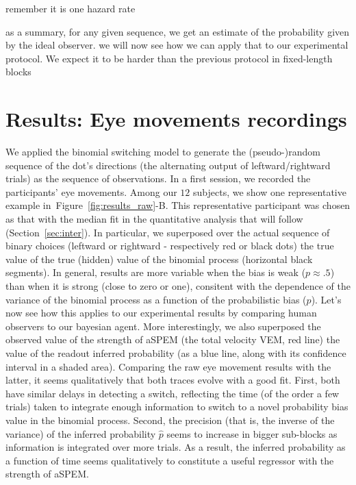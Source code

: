 \documentclass[profile,final,english,draft]{article}%
\newcommand{\seeFig}[1]{Figure~\ref{fig:#1}}
\newcommand{\seeSec}[1]{Section~\ref{sec:#1}}
\begin{document}
remember it is one hazard rate

as a summary, for any given sequence,
 we get an estimate of the probability given by the ideal observer.
 we will now see how we can apply that to our experimental protocol.
 We expect it to be harder than the previous protocol
 in fixed-length blocks

\section{Results: Eye movements recordings}
\label{sec:eye_rec}
We applied the binomial switching model
to generate the (pseudo-)random sequence of
the dot's directions (the alternating output of leftward/rightward trials)
as the sequence of observations.
In a first session, we recorded the participants' eye movements.
Among our $12$ subjects,
we show one representative example in~\seeFig{results_raw}-B.
This representative participant was chosen as that
with the median fit in the quantitative analysis
that will follow (\seeSec{inter}).
In particular, we superposed over the actual sequence of binary choices
(leftward or rightward - respectively red or black dots)
the true value of the true (hidden) value
of the binomial process (horizontal black segments).
In general, results are more variable when the bias is weak ($p\approx .5$)
than when it is strong (close to zero or one),
consitent with the dependence of the variance of the binomial process
as a function of the probabilistic bias ($p$).
Let's now see how this applies to our experimental results
by comparing human observers to our bayesian agent.
More interestingly, we also superposed
the observed value of the strength of aSPEM
(the total velocity VEM, red line)
the value of the readout inferred probability
(as a blue line, along with its confidence interval in a shaded area).
Comparing the raw eye movement results with the latter,
it seems qualitatively that both traces evolve with a good fit.
First, both have similar delays in detecting a switch,
reflecting the time (of the order a few trials) taken to integrate enough information
to switch to a novel probability bias value in the binomial process.
Second, the precision (that is, the inverse of the variance)
of the inferred probability $\hat{p}$ seems to increase
in bigger sub-blocks as information is integrated over more trials.
As a result, the inferred probability as a function of time
seems qualitatively to constitute a useful regressor
with the strength of aSPEM.
\end{document}
